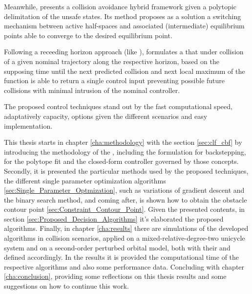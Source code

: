 Meanwhile, \cite{matias2025hybrid} presents a collision avoidance hybrid  framework given a polytopic delimitation of the unsafe states. Its method proposes as a solution a switching mechanism between active half-spaces and associated (intermediate) equilibrium points able to converge to the desired equilibrium point.

Following a receeding horizon approach (like ), \cite{breeden2022predictive} formulates a  that under collision of a given nominal trajectory along the respective horizon, based on the supposing time until the next predicted collision and next local maximum of the  function is able to return a single control input preventing possible future collisions with minimal intrusion of the nominal controller.  

The proposed control techniques stand out by the fast computational speed, adaptatively capacity, options given the different scenarios and easy implementation. 

This thesis starts in chapter \ref{cha:methodology} with the section \ref{sec:clf_cbf} by introducing the methodology of the , including the formulation for backstepping, for the polytope fit and the closed-form controller governed by those concepts. Secondly, it is presented the particular methods used by the proposed techniques, the different single parameter optimization algorithms \ref{sec:Single_Parameter_Optmization}, such as variations of gradient descent and the binary search method, and coming after, is shown how to obtain the obstacle contour point \ref{sec:Constraint_Contour_Point}. Given the presented contents, in section \ref{sec:Proposed_Decision_Algorithms} it's elaborated the proposed algorithms. Finally, in chapter \ref{cha:results} there are simulations of the developed algorithms in collision scenarios, applied on a mixed-relative-degree-two unicycle system and on a second-order perturbed orbital model, both with their  and  defined accordingly. In the results it is provided the computational time of the respective algorithms and also some performance data. Concluding with chapter \ref{cha:conclusion}, providing some reflections on this thesis results and some suggestions on how to continue this work.































